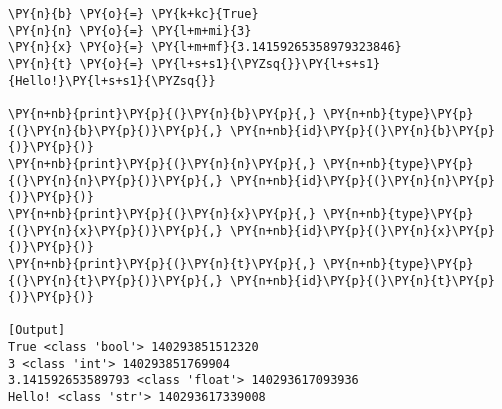 \begin{Verbatim}[label=\makebox{\href{https://github.com/unipi-physics-labs/lab1-notes/tree/main/snippy/variables.py}{https://github.com/.../variables.py}},commandchars=\\\{\}]
\PY{n}{b} \PY{o}{=} \PY{k+kc}{True}
\PY{n}{n} \PY{o}{=} \PY{l+m+mi}{3}
\PY{n}{x} \PY{o}{=} \PY{l+m+mf}{3.14159265358979323846}
\PY{n}{t} \PY{o}{=} \PY{l+s+s1}{\PYZsq{}}\PY{l+s+s1}{Hello!}\PY{l+s+s1}{\PYZsq{}}

\PY{n+nb}{print}\PY{p}{(}\PY{n}{b}\PY{p}{,} \PY{n+nb}{type}\PY{p}{(}\PY{n}{b}\PY{p}{)}\PY{p}{,} \PY{n+nb}{id}\PY{p}{(}\PY{n}{b}\PY{p}{)}\PY{p}{)}
\PY{n+nb}{print}\PY{p}{(}\PY{n}{n}\PY{p}{,} \PY{n+nb}{type}\PY{p}{(}\PY{n}{n}\PY{p}{)}\PY{p}{,} \PY{n+nb}{id}\PY{p}{(}\PY{n}{n}\PY{p}{)}\PY{p}{)}
\PY{n+nb}{print}\PY{p}{(}\PY{n}{x}\PY{p}{,} \PY{n+nb}{type}\PY{p}{(}\PY{n}{x}\PY{p}{)}\PY{p}{,} \PY{n+nb}{id}\PY{p}{(}\PY{n}{x}\PY{p}{)}\PY{p}{)}
\PY{n+nb}{print}\PY{p}{(}\PY{n}{t}\PY{p}{,} \PY{n+nb}{type}\PY{p}{(}\PY{n}{t}\PY{p}{)}\PY{p}{,} \PY{n+nb}{id}\PY{p}{(}\PY{n}{t}\PY{p}{)}\PY{p}{)}

[Output]
True <class 'bool'> 140293851512320
3 <class 'int'> 140293851769904
3.141592653589793 <class 'float'> 140293617093936
Hello! <class 'str'> 140293617339008
\end{Verbatim}
